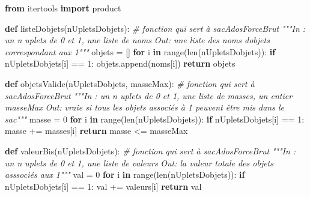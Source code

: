 \documentclass[
  paper=a4,
  ,captions=tableheading
]{scrartcl}
\newenvironment{Shaded}{}{}
\newcommand{\BuiltInTok}[1]{\textcolor[rgb]{0.00,0.50,0.00}{#1}}
\newcommand{\CommentTok}[1]{\textcolor[rgb]{0.38,0.63,0.69}{\textit{#1}}}
\newcommand{\ControlFlowTok}[1]{\textcolor[rgb]{0.00,0.44,0.13}{\textbf{#1}}}
\newcommand{\DecValTok}[1]{\textcolor[rgb]{0.25,0.63,0.44}{#1}}
\newcommand{\ImportTok}[1]{\textcolor[rgb]{0.00,0.50,0.00}{\textbf{#1}}}
\newcommand{\KeywordTok}[1]{\textcolor[rgb]{0.00,0.44,0.13}{\textbf{#1}}}
\newcommand{\NormalTok}[1]{#1}
\newcommand{\OperatorTok}[1]{\textcolor[rgb]{0.40,0.40,0.40}{#1}}
\begin{document}
\begin{Shaded}
\begin{Highlighting}[]
\ImportTok{from}\NormalTok{ itertools }\ImportTok{import}\NormalTok{ product}


\KeywordTok{def}\NormalTok{ listeDobjets(nUpletsDobjets):  }\CommentTok{\# fonction qui sert à sacAdosForceBrut}
    \CommentTok{"""In : un n uplets de 0 et 1, une liste de noms}
\CommentTok{    Out: une liste des noms d\textquotesingle{}objets correspondant aux 1"""}
\NormalTok{    objets }\OperatorTok{=}\NormalTok{ []}
    \ControlFlowTok{for}\NormalTok{ i }\KeywordTok{in} \BuiltInTok{range}\NormalTok{(}\BuiltInTok{len}\NormalTok{(nUpletsDobjets)):}
        \ControlFlowTok{if}\NormalTok{ nUpletsDobjets[i] }\OperatorTok{==} \DecValTok{1}\NormalTok{:}
\NormalTok{            objets.append(noms[i])}
    \ControlFlowTok{return}\NormalTok{ objets}


\KeywordTok{def}\NormalTok{ objetsValide(nUpletsDobjets, masseMax):  }\CommentTok{\# fonction qui sert à sacAdosForceBrut}
    \CommentTok{"""In : un n uplets de 0 et 1, une liste de masses, un entier masseMax}
\CommentTok{    Out: vraie si tous les objets associés à 1 peuvent être mis dans le sac"""}
\NormalTok{    masse }\OperatorTok{=} \DecValTok{0}
    \ControlFlowTok{for}\NormalTok{ i }\KeywordTok{in} \BuiltInTok{range}\NormalTok{(}\BuiltInTok{len}\NormalTok{(nUpletsDobjets)):}
        \ControlFlowTok{if}\NormalTok{ nUpletsDobjets[i] }\OperatorTok{==} \DecValTok{1}\NormalTok{:}
\NormalTok{            masse }\OperatorTok{+=}\NormalTok{ masses[i]}
    \ControlFlowTok{return}\NormalTok{ masse }\OperatorTok{\textless{}=}\NormalTok{ masseMax}


\KeywordTok{def}\NormalTok{ valeurBis(nUpletsDobjets):  }\CommentTok{\# fonction qui sert à sacAdosForceBrut}
    \CommentTok{"""In : un n uplets de 0 et 1, une liste de valeurs}
\CommentTok{    Out: la valeur totale des objets asssociés aux 1"""}
\NormalTok{    val }\OperatorTok{=} \DecValTok{0}
    \ControlFlowTok{for}\NormalTok{ i }\KeywordTok{in} \BuiltInTok{range}\NormalTok{(}\BuiltInTok{len}\NormalTok{(nUpletsDobjets)):}
        \ControlFlowTok{if}\NormalTok{ nUpletsDobjets[i] }\OperatorTok{==} \DecValTok{1}\NormalTok{:}
\NormalTok{            val }\OperatorTok{+=}\NormalTok{ valeurs[i]}
    \ControlFlowTok{return}\NormalTok{ val}



\end{Highlighting}
\end{Shaded}
\end{document}
